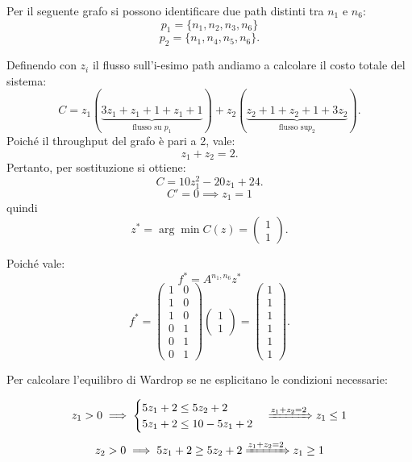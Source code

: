 \begin{alphaparts}

    \questionpart

    Per il seguente grafo si possono identificare due path distinti tra \(n_1\) e \(n_6\):
    \[p_1 = \{n_1, n_2, n_3, n_6\}\]
    \[p_2 = \{n_1, n_4, n_5, n_6\}.\]

    Definendo con \(z_i\) il flusso sull'i-esimo path andiamo a calcolare il costo totale del sistema:
    \[C = z_1(\underbrace{3z_1+ z_1+ 1+ z_1+ 1}_{ \text{flusso su }p_1})+ z_2(\underbrace{z_2+ 1 +z_2+ 1 + 3z_2}_{ \text{flusso su} p_2}).\]
    Poiché il throughput del grafo è pari a 2, vale:
    \[z_1+ z_2 = 2.\]
    Pertanto, per sostituzione si ottiene:
    \[C = 10z_1^2 - 20z_1 + 24. \]
    \[C' = 0 \implies z_1 = 1\]
    quindi
    \[z^* = \arg\min C(z) = \begin{pmatrix}
        1\\
        1
    \end{pmatrix}.  \]

    Poiché vale:
    \[ f^* = A^{n_1,n_6}z^*\]
    \[ f^* = \begin{pmatrix}
        1 & 0 \\
        1 & 0 \\
        1 & 0 \\
        0 & 1 \\
        0 & 1 \\
        0 & 1 
    \end{pmatrix} \begin{pmatrix} 1 \\ 1 \end{pmatrix}
     = \begin{pmatrix}
        1 \\ 1 \\ 1 \\ 1 \\ 1 \\ 1
    \end{pmatrix}. \]


    \questionpart
    
    Per calcolare l'equilibro di Wardrop se ne esplicitano le condizioni necessarie:

    \[z_1 > 0 \implies \begin{cases} 5z_1 + 2 \leq 5z_2 + 2 \\ 5z_1 + 2 \leq 10- 5z_1 + 2 \end{cases} \xRightarrow[]{z_1+ z_2= 2} z_1 \leq 1\]
    \[ z_2 > 0 \implies 5z_1 + 2 \geq 5z_2 + 2 \xRightarrow[]{z_1+ z_2= 2} z_1 \geq 1 \]


\end{alphaparts}
